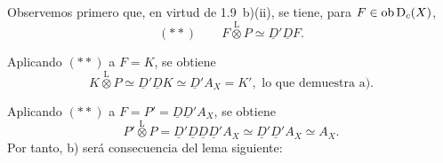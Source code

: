 Observemos primero que, en virtud de 1.9~b)(ii), se tiene, para $F \in \operatorname{ob} \mathrm{D}_c(X)$,
\[
(**) \qquad F \mathop{\otimes}\limits^{\mathrm{L}} P \simeq \underline{D}'\underline{D} F.
\]

Aplicando $(**)$ a $F = K$, se obtiene
\[
K \mathop{\otimes}\limits^{\mathrm{L}} P \simeq \underline{D}'\underline{D} K \simeq \underline{D}' A_X = K', \text{ lo que demuestra a).}
\]

Aplicando $(**)$ a $F = P' = \underline{D}\underline{D}'A_X$, se obtiene
\[
P' \mathop{\otimes}\limits^{\mathrm{L}} P = \underline{D}'\underline{D}\underline{D}\underline{D}'A_X \simeq \underline{D}'\underline{D}'A_X \simeq A_X.
\]
Por tanto, b) será consecuencia del lema siguiente:
